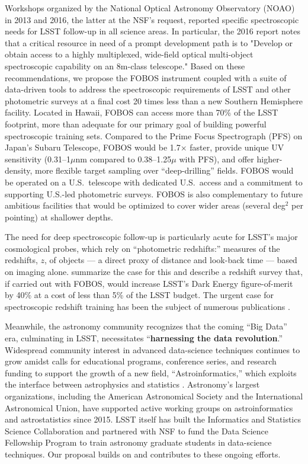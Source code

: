 \documentclass[oneside,11pt]{amsart}
\newcommand{\comment}[2][todo]{{\color{#1}[[{\bf #2}]]}}
\begin{document}
Workshops organized by the National Optical Astronomy Observatory (NOAO)
in 2013 and 2016, the latter at the NSF's request, reported specific
spectroscopic needs for LSST follow-up in all science areas.  In
particular, the 2016 report notes that a critical resource in need of a
prompt development path is to "Develop or obtain access to a highly
multiplexed, wide-field optical multi-object spectroscopic capability on
an 8m-class telescope."  Based on these recommendations, we propose the
FOBOS instrument coupled with a suite of data-driven tools to address
the spectroscopic requirements of LSST and other photometric surveys at
a final cost 20 times less than a new Southern Hemisphere facility.
Located in Hawaii, FOBOS can access more than 70\% of the LSST
footprint, more than adequate for our primary goal of building powerful
spectroscopic training sets.  Compared to the Prime Focus Spectrograph
(PFS) on Japan's Subaru Telescope, FOBOS would be 1.7$\times$ faster,
provide unique UV sensitivity (0.31--1$\mu$nm compared to
0.38--1.25$\mu$ with PFS), and offer higher-density, more flexible
target sampling over ``deep-drilling'' fields.  FOBOS would be operated
on a U.S.\ telescope with dedicated U.S.\ access and a commitment to
supporting U.S.-led photometric surveys.  FOBOS is also complementary to
future ambitious facilities that would be optimized to cover wider areas
(several deg$^2$ per pointing) at shallower depths.


The need for deep spectroscopic follow-up is particularly acute for
LSST's major cosmological probes, which rely on ``photometric
redshifts:'' measures of the redshifts, $z$, of objects --- a direct
proxy of distance and look-back time --- based on imaging alone.
\citet{newman15} summarize the case for this and describe a redshift
survey that, if carried out with FOBOS, would increase LSST's Dark
Energy figure-of-merit by 40\% at a cost of less than 5\% of the LSST
budget.  The urgent case for spectroscopic redshift training has been
the subject of numerous publications \citep[e.g.,][]{laureijs11,
masters15, hemmati18}.

Meanwhile, the astronomy community recognizes that the coming ``Big
Data'' era, culminating in LSST, necessitates ``\textbf{harnessing the
data revolution}.''  Widespread community interest in advanced
data-science techniques continues to grow amidst calls for educational
programs, conference series, and research funding to support the growth
of a new field, ``Astroinformatics,'' which exploits the interface
between astrophysics and statistics \citep{borne09}.  Astronomy's
largest organizations, including the American Astronomical Society and
the International Astronomical Union, have supported active working
groups on astroinformatics and astrostatistics since 2015.  LSST itself
has built the Informatics and Statistics Science Collaboration and
partnered with NSF to fund the Data Science Fellowship Program to train
astronomy graduate students in data-science techniques.  Our proposal
builds on and contributes to these ongoing efforts.
\end{document}
